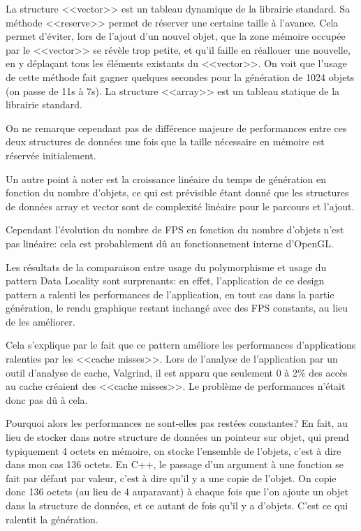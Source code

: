 \documentclass[a4paper,french,12pt]{article}
\begin{document}
	La structure <<vector>> est un tableau dynamique de la librairie standard. 
	Sa méthode <<reserve>> permet de réserver une certaine taille à l'avance. Cela permet d'éviter, lors de l'ajout
	d'un nouvel objet, que la zone mémoire occupée par le <<vector>> se révèle trop petite, et qu'il faille en
	réallouer une nouvelle, en y déplaçant tous les éléments existants du <<vector>>. On voit que l'usage de cette méthode
	fait gagner quelques secondes pour la génération de 1024 objets (on passe de 11s à 7s).
	La structure <<array>> est un tableau statique de la librairie standard.
	
	On ne remarque cependant pas de différence majeure de performances entre ces deux structures de données une fois
	que la taille nécessaire en mémoire est réservée initialement.
	
	Un autre point à noter est la croissance linéaire du temps de génération en fonction du nombre d'objets, ce qui
	est prévisible étant donné que les structures de données array et vector sont de complexité linéaire pour le parcours
	et l'ajout.
	
	Cependant l'évolution du nombre de FPS en fonction du nombre d'objets n'est pas linéaire: cela est probablement
	dû au fonctionnement interne d'OpenGL.
	
	Les résultats de la comparaison entre usage du polymorphisme et usage du pattern Data Locality 
	sont surprenants: en effet, l'application de ce design pattern a ralenti les performances 
	de l'application, en tout cas dans la partie génération, le rendu graphique restant inchangé avec 
	      des FPS constants, au lieu de les améliorer.
	      
	      Cela s'explique par le fait que ce pattern améliore les performances d'applications ralenties par les 
	      <<cache misses>>. Lors de l'analyse de l'application par un outil d'analyse de cache, Valgrind, il est
	      apparu que seulement 0 à 2\% des accès au cache créaient des <<cache misses>>. Le problème de performances
	      n'était donc pas dû à cela.
	      
	      Pourquoi alors les performances ne sont-elles pas restées constantes? En fait, au lieu de stocker dans notre
	      structure de données un pointeur sur objet, qui prend typiquement 4 octets en mémoire, on stocke 
	      l'ensemble de l'objets, c'est à dire dans mon cas 136 octets. En C++, le passage d'un argument
	      à une fonction se fait par défaut par valeur, c'est à dire qu'il y a une copie de l'objet.
	      On copie donc 136 octets (au lieu de 4 auparavant) à chaque fois que l'on ajoute un objet dans la structure de données, et ce 
	      autant de fois qu'il y a d'objets. C'est ce qui ralentit la génération.
		      
\end{document}
